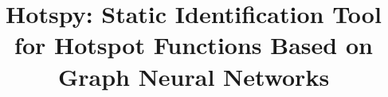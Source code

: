 \documentclass[lineno,sn-mathphys]{sn-jnl}%
\theoremstyle{thmstyleone}%
\theoremstyle{thmstyletwo}%
\theoremstyle{thmstylethree}%
\begin{document}
\title[Hotspy]{Hotspy: Static Identification Tool for Hotspot Functions Based on Graph Neural Networks}


\author[1]{ }

%
%
%
%
%
%
%


\end{document}
